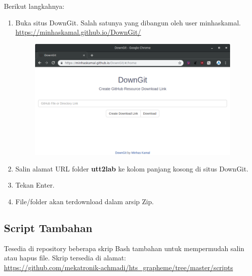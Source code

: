 \documentclass[12pt,]{article}
\begin{document}
	Berikut langkahnya:
	\begin{enumerate}
		\item Buka situs DownGit.
		Salah satunya yang dibangun oleh user minhaskamal.\\
		\url{https://minhaskamal.github.io/DownGit/}
		
		\begin{figure}[!ht]
			\centering
			\includegraphics[width=450pt]{downgit.png}
		\end{figure}
		
		\item Salin alamat URL folder \textbf{utt2lab} ke kolom panjang kosong di situs DownGit.
		
		\item Tekan Enter.
		
		\item File/folder akan terdownload dalam arsip Zip.
	\end{enumerate}

	\subsection{Script Tambahan}
	
	Tesedia di repository beberapa skrip Bash tambahan untuk mempermudah salin atau hapus file.
	Skrip tersedia di alamat:\\
	\url{https://github.com/mekatronik-achmadi/hts_grapheme/tree/master/scripts}
	
\end{document}
